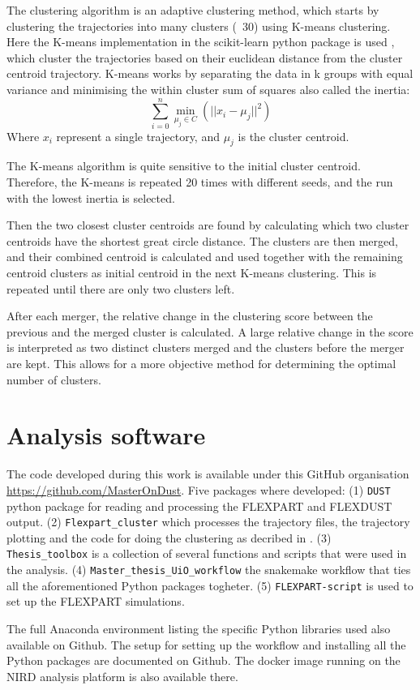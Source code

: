 The \textcite{dorling1992cluster} clustering algorithm is an adaptive clustering method, which starts by clustering the trajectories into many clusters (~30) using K-means clustering. Here the K-means implementation in the scikit-learn python package is used \parencite{scikit-learn}, which cluster the trajectories based on their euclidean distance from the cluster centroid trajectory. K-means works by separating the data in k groups with equal variance and minimising the within cluster sum of squares also called the inertia: 
\begin{equation}
    \sum_{i=0}^{n}\min_{\mu_j \in C}(||x_i - \mu_j||^2)
\end{equation}
Where $x_i$ represent a single trajectory, and $\mu_j$ is the cluster centroid. 

The K-means algorithm is quite sensitive to the initial cluster centroid. Therefore, the K-means is repeated 20 times with different seeds, and the run with the lowest inertia is selected. 

Then the two closest cluster centroids are found by calculating which two cluster centroids have the shortest great circle distance. The clusters are then merged, and their combined centroid is calculated and used together with the remaining centroid clusters as initial centroid in the next K-means clustering. This is repeated until there are only two clusters left. 

After each merger, the relative change in the clustering score between the previous and the merged cluster is calculated. A large relative change in the score is interpreted as two distinct clusters merged and the clusters before the merger are kept. This allows for a more objective method for determining the optimal number of clusters.    

\chapter{Analysis software}\label{appendix:software}
The code developed during this work is available under this GitHub organisation \url{https://github.com/MasterOnDust}. Five packages where developed: (1) \verb|DUST| python package for reading and processing the FLEXPART and FLEXDUST output. (2) \verb|Flexpart_cluster| which processes the trajectory files,  the trajectory plotting and the code for doing the clustering as decribed in . (3) \verb|Thesis_toolbox| is a collection of several functions and scripts that were used in the analysis. 
(4) \verb|Master_thesis_UiO_workflow| the snakemake workflow that ties all the aforementioned Python packages togheter. (5)
\verb|FLEXPART-script| is used to set up the FLEXPART simulations. 

The full Anaconda environment listing the specific Python libraries used also available on Github. The setup for setting up the workflow and installing all the Python packages are documented on Github. The docker image running on the NIRD analysis platform is also available there.

